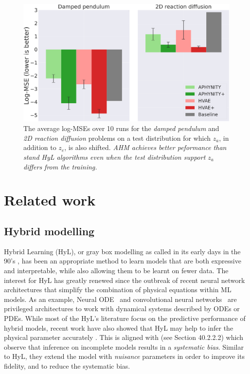 \documentclass{article}
\begin{document}
\begin{figure}
    \centering
    \includegraphics[width=.48\textwidth]{figures/results_log_mse_za_OOD-4.png}
    \vspace{-2em}
    \caption{The average log-MSEs over 10 runs for the \textit{damped pendulum} and \textit{2D reaction diffusion} problems on a test distribution for which $z_a$, in addition to $z_e$, is also shifted. \textit{AHM achieves better peformance than stand HyL algorithms even when the test distribution support $z_a$ differs from the training.}}
    \label{fig:za_shifted}
    \vspace{-1.em}
\end{figure}

\section{Related work}
\subsection{Hybrid modelling}
Hybrid Learning (HyL), or gray box modelling as called in its early days in the 90's \citep{old_hl_1, old_hl_2, old_hl_3, old_hl_4, old_hl_5}, has been an appropriate method to learn models that are both expressive and interpretable, while also allowing them to be learnt on fewer data. The interest for HyL \citep{hl_1, hl_2, hl_3, hl_4, hl_5, hl_6, metnet2} has greatly renewed since the outbreak of recent neural network architectures that simplify the combination of physical equations within ML models. As an example, Neural ODE~\citep{NODE} and convolutional neural networks~\citep[][CNN]{lecun_cnn} are privileged architectures to work with dynamical systems described by ODEs or PDEs. While most of the HyL's literature focus on the predictive performance of hybrid models, recent work have also showed that HyL may help to infer the physical parameter accurately \citep{APHYNITY, HVAE}. This is aligned with \citet{nuisance_para} (see Section 40.2.2.2) which observe that inference on incomplete models results in a \textit{systematic bias}. Similar to HyL, they extend the model with \textit{nuisance} parameters in order to improve its fidelity, and to reduce the systematic bias.
\end{document}
